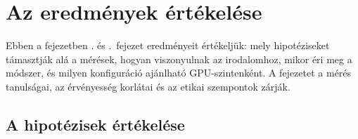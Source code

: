 \chapter{Az eredmények értékelése}
\label{ch:diszkusszio}

Ebben a fejezetben \az{\ref{ch:eredmenyek}}. és \az{\ref{ch:modellek}}.~fejezet eredményeit értékeljük: mely
hipotéziseket támasztják alá a mérések, hogyan viszonyulnak az irodalomhoz, mikor éri meg a módszer, és
milyen konfiguráció ajánlható GPU-szintenként. A fejezetet a mérés tanulságai, az érvényesség korlátai és az
etikai szempontok zárják.

\section{A hipotézisek értékelése}
\label{sec:hipotezis-ertekeles}

